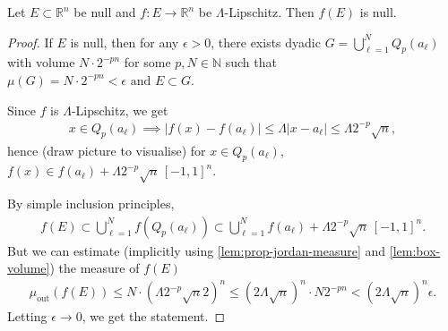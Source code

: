 \begin{lemma}\label{lem:lipschitz-maps-preserve-null}
	Let $E \subset \mathbb{R}^{n}$ be null and $f: E \to \mathbb{R}^{n}$ be $\Lambda$-Lipschitz. Then $f(E)$ is null.
\end{lemma}
\begin{proof}
	If $E$ is null, then for any $\epsilon > 0$, there exists dyadic $G = \bigcup_{\ell=1}^{N} Q_{p}(a_{\ell})$ with volume $N \cdot 2^{-pn}$ for some $p, N \in \mathbb{N}$ such that $\mu(G) = N \cdot 2^{-pn} < \epsilon \text{ and } E \subset G$.

	Since $f$ is $\Lambda$-Lipschitz, we get
	\begin{align*}
		x \in Q_{p}(a_{\ell}) \implies \left| f(x) - f(a_{\ell}) \right| \leq \Lambda \left| x - a_{\ell} \right| \leq \Lambda 2^{-p} \sqrt{n},
	\end{align*}
	hence (draw picture to visualise) for $x \in Q_{p}(a_{\ell})$, $f(x) \in f(a_{\ell}) + \Lambda 2^{-p} \sqrt{n} \, [-1, 1]^{n}$.

	By simple inclusion principles,
	\begin{align*}
		f(E) \subset \bigcup_{\ell=1}^{N} f(Q_{p}(a_{\ell})) \subset \bigcup_{\ell=1}^{N} f(a_{\ell}) + \Lambda 2^{-p}\sqrt{n} \, [-1, 1]^{n}.
	\end{align*}
	But we can estimate (implicitly using \ref{lem:prop-jordan-measure} and \ref{lem:box-volume}) the measure of $f(E)$
	\begin{align*}
		\mu_{\text{out}}(f(E)) \leq N \cdot (\Lambda 2^{-p} \sqrt{n} 2)^{n} \leq (2 \Lambda \sqrt{n})^{n} \cdot N 2^{-pn} < (2 \Lambda \sqrt{n})^{n} \epsilon.
	\end{align*}
	Letting $\epsilon \to 0$, we get the statement.
\end{proof}

